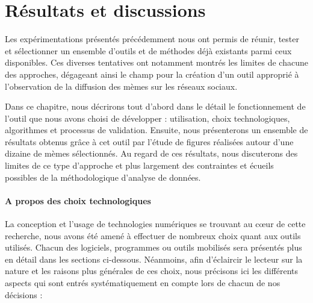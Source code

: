 \chapter{Résultats et discussions}

Les expérimentations présentés précédemment nous ont permis de réunir, tester et sélectionner un ensemble d'outils et de méthodes déjà existants parmi ceux disponibles. Ces diverses tentatives ont notamment montrés les limites de chacune des approches, dégageant ainsi le champ pour la création d'un outil approprié à l'observation de la diffusion des mèmes sur les réseaux sociaux. 

Dans ce chapitre, nous décrirons tout d'abord dans le détail le fonctionnement de l'outil que nous avons choisi de développer : utilisation, choix technologiques, algorithmes et processus de validation. Ensuite, nous présenterons un ensemble de résultats obtenus grâce à cet outil par l'étude de figures réalisées autour d'une dizaine de mèmes sélectionnés. Au regard de ces résultats, nous discuterons des limites de ce type d'approche et plus largement des contraintes et écueils possibles de la méthodologique d'analyse de données.

\subsubsection{A propos des choix technologiques}

    La conception et l'usage de technologies numériques se trouvant au cœur de cette recherche, nous avons été amené à effectuer de nombreux choix quant aux outils utilisés. Chacun des logiciels, programmes ou outils mobilisés sera présentés plus en détail dans les sections ci-dessous. Néanmoins, afin d'éclaircir le lecteur sur la nature et les raisons plus générales de ces choix, nous précisons ici les différents aspects qui sont entrés systématiquement en compte lors de chacun de  nos décisions :


